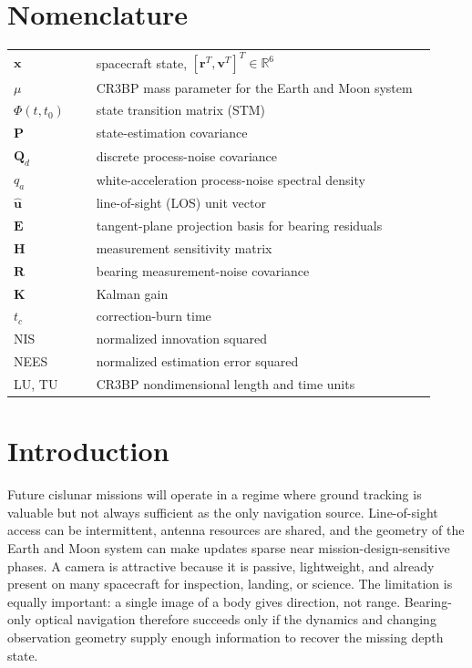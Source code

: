 \documentclass[10pt,twocolumn]{article}
\newcommand{\vect}[1]{\mathbf{#1}}
\newcommand{\unit}[1]{\hat{\mathbf{#1}}}
\begin{document}
\section*{Nomenclature}
\begin{tabular}{@{}p{0.18\linewidth}p{0.74\linewidth}@{}}
$\vect{x}$ & spacecraft state, $[\vect{r}^T,\vect{v}^T]^T\in\mathbb{R}^6$ \\
$\mu$ & CR3BP mass parameter for the Earth and Moon system \\
$\Phi(t,t_0)$ & state transition matrix (STM) \\
$\vect{P}$ & state-estimation covariance \\
$\vect{Q}_d$ & discrete process-noise covariance \\
$q_a$ & white-acceleration process-noise spectral density \\
$\unit{u}$ & line-of-sight (LOS) unit vector \\
$\vect{E}$ & tangent-plane projection basis for bearing residuals \\
$\vect{H}$ & measurement sensitivity matrix \\
$\vect{R}$ & bearing measurement-noise covariance \\
$\vect{K}$ & Kalman gain \\
$t_c$ & correction-burn time \\
NIS & normalized innovation squared \\
NEES & normalized estimation error squared \\
LU, TU & CR3BP nondimensional length and time units \\
\end{tabular}

\section{Introduction}
Future cislunar missions will operate in a regime where ground tracking is valuable but not always sufficient as the only navigation source.  Line-of-sight access can be intermittent, antenna resources are shared, and the geometry of the Earth and Moon system can make updates sparse near mission-design-sensitive phases.  A camera is attractive because it is passive, lightweight, and already present on many spacecraft for inspection, landing, or science.  The limitation is equally important: a single image of a body gives direction, not range.  Bearing-only optical navigation therefore succeeds only if the dynamics and changing observation geometry supply enough information to recover the missing depth state.
\end{document}
